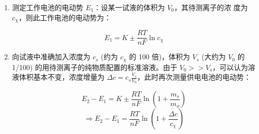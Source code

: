 \begin{enumerate}
    \item 测定工作电池的电动势 $E_1$：设某一试液的体积为 $V_0$，其待测离子的浓
          度为 $c_\chi$，则此工作电池的电动势为：

          \begin{equation}
              E_1 = K \pm \frac{RT}{nF} \ln c_\chi
          \end{equation}
    \item 向试液中准确加入浓度为 $c_s$ (约为 $c_\chi$ 的 100 倍)，体积为 $V_s$
          (大约为 $V_0$ 的 1/100) 的用待测离子的纯物质配置的标准溶液。由于 $V_0 >>
              V_s$，可以认为溶液体积基本不变，浓度增量为 $\Delta c = c_s \frac{V_s}
              {V_0} $，此时再次测量供电电池的电动势：

          \begin{equation}
              E_2 - E_1 = K \pm \frac{RT}{nF} \ln \left( 1 + \frac{m_s}{m_x}
              \right)
          \end{equation}
          \begin{equation}
              \Rightarrow E_2 - E_1 = \frac{RT}{nF} \ln (1 + \frac{\Delta c}
              {c_\chi})
          \end{equation}
\end{enumerate}
